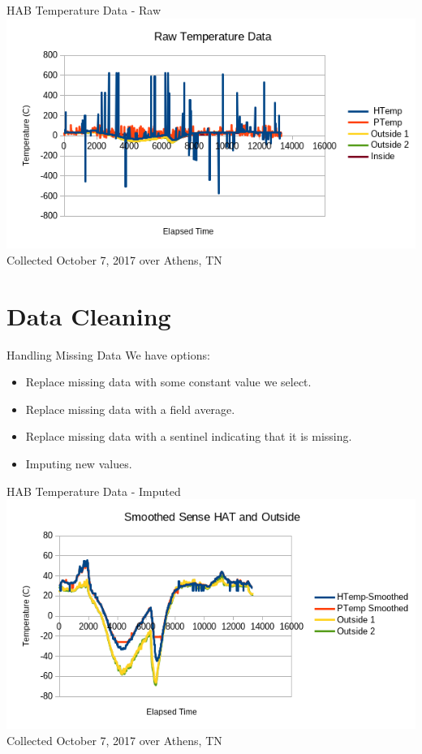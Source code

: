 \documentclass[handout]{beamer}
\begin{document}
\begin{frame}{HAB Temperature Data - Raw}
\includegraphics[width=\textwidth]{images/rawtemp}
{\tiny Collected October 7, 2017 over Athens, TN}
\end{frame}

\section{Data Cleaning}
\begin{frame}{Handling Missing Data}
We have options:
\begin{itemize}[<+->]
  \item Replace missing data with some constant value we select.
  \item Replace missing data with a field average.
  \item Replace missing data with a sentinel indicating that it is missing.
  \item Imputing new values.
\end{itemize}
\end{frame}

\begin{frame}{HAB Temperature Data - Imputed}
\includegraphics[width=\textwidth]{images/smoothtemp}
{\tiny Collected October 7, 2017 over Athens, TN}
\end{frame}
\end{document}
